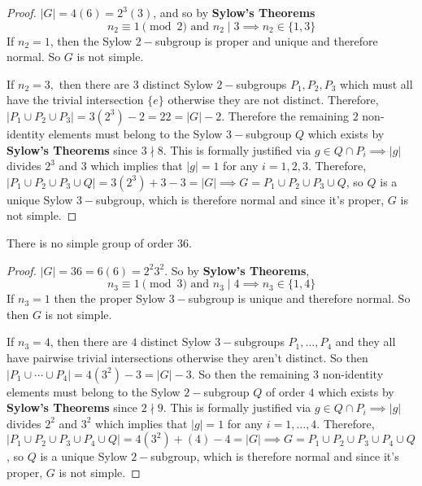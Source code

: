 \documentclass[addpoints,10pt]{exam}
\theoremstyle{plain}
\theoremstyle{definition}
\newtheorem{prob}[thm]{Problem}
\theoremstyle{plain}
\theoremstyle{plain}
\theoremstyle{definition}
\let\oldprob\prob
\let\endoldprob\endprob
\renewenvironment{prob}
  {\begin{singlespace}\oldprob}
  {\endoldprob\end{singlespace}}
\newcommand{\belowtitle}{\leavevmode\newline}
\begin{document}
\begin{proof}
  $|G|=4(6)=2^{3}(3)$, and so by \textbf{Sylow's Theorems}
  $$n_{2}\equiv 1\pmod{2}\text{ and }n_{2}\mid 3\implies n_{2}\in \{1,3\}$$
  If $n_{2}=1$, then the Sylow $2-$subgroup is proper and unique and therefore normal. So $G$ is not simple.

  If $n_{2}=3,$ then there are $3$ distinct Sylow $2-$subgroups $P_{1},P_{2},P_{3}$ which must all have the trivial intersection $\{e\}$ otherwise they are not distinct. Therefore, $|P_{1}\cup P_{2}\cup P_{3}|=3(2^{3})-2=22=|G|-2$. Therefore the remaining $2$ non-identity elements must belong to the Sylow $3-$subgroup $Q$ which exists by \textbf{Sylow's Theorems} since $3\nmid 8$. This is formally justified via $g\in Q\cap P_{i}\implies |g|$ divides $2^{3}$ and $3$ which implies that $|g|=1$ for any $i=1,2,3$. Therefore, $|P_{1}\cup P_{2}\cup P_{3}\cup Q|=3(2^{3})+3-3=|G|\implies G=P_{1}\cup P_{2}\cup P_{3}\cup Q$, so $Q$ is a unique Sylow $3-$subgroup, which is therefore normal and since it's proper, $G$ is not simple.

\end{proof}
\newpage
\begin{prob}\belowtitle
There is no simple group of order $36$.
\end{prob}

\begin{proof}
  $|G|=36=6(6)=2^{2}3^{2}$. So by \textbf{Sylow's Theorems},
  $$n_{3}\equiv 1\pmod{3}\text{ and }n_{3}\mid 4\implies n_{3}\in \{1,4\}$$
  If $n_{3}=1$ then the proper Sylow $3-$subgroup is unique and therefore normal. So then $G$ is not simple.

  If $n_{3}=4$, then there are $4$ distinct Sylow $3-$subgroups $P_{1},\hdots,P_{4}$ and they all have pairwise trivial intersections otherwise they aren't distinct. So then $|P_{1}\cup \cdots \cup P_{4}|=4(3^{2})-3=|G|-3$. So then the remaining $3$ non-identity elements must belong to the Sylow $2-$subgroup $Q$ of order $4$ which exists by \textbf{Sylow's Theorems} since $2\nmid 9$. This is formally justified via $g\in Q\cap P_{i}\implies |g|$ divides $2^{2}$ and $3^{2}$ which implies that $|g|=1$ for any $i=1,\hdots, 4$. Therefore, $|P_{1}\cup P_{2}\cup P_{3}\cup P_{4}\cup Q|=4(3^{2})+(4)-4=|G|\implies G=P_{1}\cup P_{2}\cup P_{3}\cup P_{4}\cup Q$, so $Q$ is a unique Sylow $2-$subgroup, which is therefore normal and since it's proper, $G$ is not simple.
\end{proof}
\end{document}
